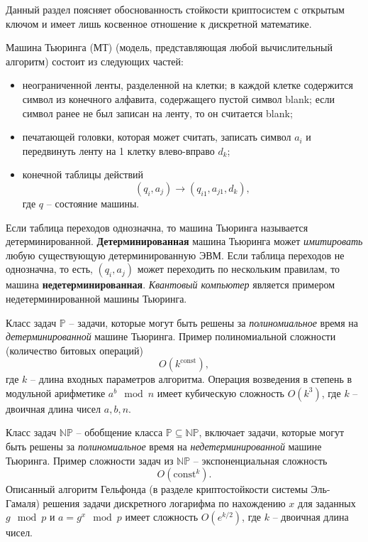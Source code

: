 \documentclass[10pt,a4paper]{book}
\newcommand{\set}[1]{\mathbb{#1}}
\begin{document}
Данный раздел поясняет обоснованность стойкости криптосистем с открытым ключом и имеет лишь косвенное отношение к дискретной математике.

Машина Тьюринга (МТ) (модель, представляющая любой вычислительный алгоритм) состоит из следующих частей:
\begin{itemize}
    \item неограниченной ленты, разделенной на клетки; в каждой клетке содержится символ из конечного алфавита, содержащего пустой символ blank; если символ ранее не был записан на ленту, то он считается blank;
    \item печатающей головки, которая может считать, записать символ $a_i$ и передвинуть ленту на 1 клетку влево-вправо $d_k$;
    \item конечной таблицы действий
    \[ (q_i, a_j) \rightarrow (q_{i1}, a_{j1}, d_k), \]
где $q$ -- состояние машины.
\end{itemize}

Если таблица переходов однозначна, то машина Тьюринга называется детерминированной. \textbf{Детерминированная} машина Тьюринга может \emph{имитировать} любую существующую детерминированную ЭВМ. Если таблица переходов не однозначна, то есть, $(q_i, a_j)$ может переходить по нескольким правилам, то машина \textbf{недетерминированная}. \emph{Квантовый компьютер} является примером недетерминированной машины Тьюринга.

Класс задач $\set{P}$ -- задачи, которые могут быть решены за \emph{полиномиальное} время на \emph{детерминированной} машине Тьюринга. Пример полиномиальной сложности (количество битовых операций)
    \[ O(k^{\textrm{const}}), \]
где $k$ -- длина входных параметров алгоритма. Операция возведения в степень в модульной арифметике $a^b \mod n$ имеет кубическую сложность $O(k^3)$, где $k$ -- двоичная длина чисел $a,b,n$.

Класс задач $\set{NP}$ -- обобщение класса $\set{P} \subseteq \set{NP}$, включает задачи, которые могут быть решены за \emph{полиномиальное} время на \emph{недетерминированной} машине Тьюринга. Пример сложности задач из $\set{NP}$ -- экспоненциальная сложность
    \[ O(\textrm{const}^k). \]
Описанный алгоритм Гельфонда (в разделе криптостойкости системы Эль-Гамаля) решения задачи дискретного логарифма по нахождению $x$ для заданных $g \mod p$ и $a = g^x \mod p$ имеет сложность $O(e^{k/2})$, где $k$ -- двоичная длина чисел.
\end{document}
